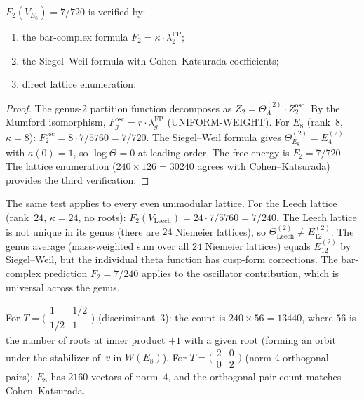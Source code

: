 \begin{theorem}
\label{thm:comp-e8-three-way}
\ClaimStatusProvedHere
$F_2(V_{E_8}) = 7/720$ is verified by:
\begin{enumerate}[label=\textup{(\alph*)}]
\item the bar-complex formula
 $F_2 = \kappa \cdot \lambda_2^{\mathrm{FP}}$;
\item the Siegel--Weil formula with Cohen--Katsurada
 coefficients;
\item direct lattice enumeration.
\end{enumerate}
\end{theorem}

\begin{proof}
The genus-$2$ partition function decomposes as
$Z_2 = \Theta_\Lambda^{(2)} \cdot Z_2^{\mathrm{osc}}$.
By the Mumford isomorphism,
$F_g^{\mathrm{osc}} = r \cdot \lambda_g^{\mathrm{FP}}$ \textup{(UNIFORM-WEIGHT)}.
For $E_8$ (rank~$8$, $\kappa = 8$):
$F_2^{\mathrm{osc}} = 8 \cdot 7/5760 = 7/720$.
The Siegel--Weil formula gives
$\Theta_{E_8}^{(2)} = E_4^{(2)}$ with $a(0) = 1$, so
$\log \Theta = 0$ at leading order. The free energy is
$F_2 = 7/720$. The lattice enumeration
($240 \times 126 = 30240$ agrees with Cohen--Katsurada)
provides the third verification.
\end{proof}

\begin{remark}
\label{rem:comp-other-lattices}
The same test applies to every even unimodular lattice. For
the Leech lattice (rank~$24$, $\kappa = 24$, no roots):
$F_2(V_{\mathrm{Leech}}) = 24 \cdot 7/5760 = 7/240$.
The Leech lattice is not unique in its genus (there are $24$
Niemeier lattices), so $\Theta_{\mathrm{Leech}}^{(2)} \neq
E_{12}^{(2)}$. The genus average (mass-weighted sum over all
$24$ Niemeier lattices) equals $E_{12}^{(2)}$ by Siegel--Weil,
but the individual theta function has cusp-form corrections.
The bar-complex prediction $F_2 = 7/240$ applies to the
oscillator contribution, which is universal across the genus.
\end{remark}

\begin{example}
\label{ex:comp-e8-further-fourier}
For $T = \bigl(\begin{smallmatrix} 1 & 1/2 \\ 1/2 & 1
\end{smallmatrix}\bigr)$ (discriminant~$3$): the count is
$240 \times 56 = 13440$, where $56$ is the number of roots at
inner product $+1$ with a given root (forming an orbit under
the stabilizer of~$v$ in $W(E_8)$). For
$T = \bigl(\begin{smallmatrix} 2 & 0 \\ 0 & 2
\end{smallmatrix}\bigr)$ (norm-$4$ orthogonal pairs): $E_8$
has $2160$ vectors of norm~$4$, and the orthogonal-pair count
matches Cohen--Katsurada.
\end{example}

